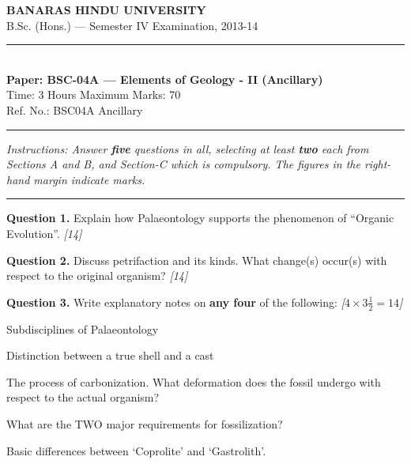 \documentclass[11pt,a4paper]{article}
\newcommand{\pts}[1]{\hfill   \textit{[#1]}}
\begin{document}
\begin{center}
  {\large\bfseries BANARAS HINDU UNIVERSITY}\\[2pt]
  {\normalsize B.Sc. (Hons.) --- Semester IV Examination, 2013-14}\\[6pt]
  \rule{0.8\linewidth}{0.5pt}\\[6pt]
  {\large\bfseries Paper: BSC-04A --- Elements of Geology - II (Ancillary)}\\[4pt]
  {\normalsize Time: 3 Hours \hfill Maximum Marks: 70}\\[2pt]
  {\small Ref. No.: BSC04A Ancillary}
\end{center}
\rule{\linewidth}{0.4pt}
\smallskip



\noindent   \textit{Instructions: Answer   \textbf{five} questions in all, selecting at least   \textbf{two} each from Sections A and B, and Section-C which is compulsory. The figures in the right-hand margin indicate marks.}
\bigskip

\bigskip


\rule{\linewidth}{0.4pt}\smallskip




\noindent   \textbf{Question 1.} Explain how Palaeontology supports the phenomenon of ``Organic Evolution''. \pts{14}

\medskip


\noindent   \textbf{Question 2.} Discuss petrifaction and its kinds. What change(s) occur(s) with respect to the original organism? \pts{14}

\medskip


\noindent   \textbf{Question 3.} Write explanatory notes on   \textbf{any four} of the following: \pts{$4  \times 3\frac{1}{2} = 14$}

\begin{parts}
  \item Subdisciplines of Palaeontology
  \item Distinction between a true shell and a cast
  \item The process of carbonization. What deformation does the fossil undergo with respect to the actual organism?
  \item What are the TWO major requirements for fossilization?
  \item Basic differences between `Coprolite' and `Gastrolith'.
\end{parts}

\bigskip
\end{document}
